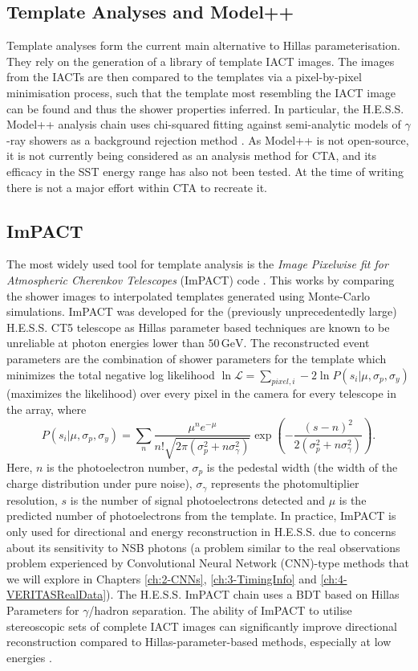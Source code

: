 \subsection{Template Analyses and Model++}
Template analyses \cite{model++} \cite{cat} \cite{3danalysis}  \cite{impact} form the current main alternative to Hillas parameterisation. They rely on the generation of a library of template IACT images. The images from the IACTs are then compared to the templates via a pixel-by-pixel minimisation process, such that the template most resembling the IACT image can be found and thus the shower properties inferred. In particular, the H.E.S.S. Model++ analysis chain uses chi-squared fitting against semi-analytic models of $\gamma$-ray showers as a background rejection method \cite{model++}. As Model++ is not open-source, it is not currently being considered as an analysis method for CTA, and its efficacy in the SST energy range has also not been tested. At the time of writing there is not a major effort within CTA to recreate it.

\subsection{ImPACT}
The most widely used tool for template analysis is the \textit{Image Pixelwise fit for Atmospheric Cherenkov Telescopes} (ImPACT) code \cite{impact}. This works by comparing the shower images to interpolated templates generated using Monte-Carlo simulations. ImPACT was developed for the (previously unprecedentedly large) H.E.S.S. CT5 telescope as Hillas parameter based techniques are known to be unreliable at photon energies lower than $\mathrm{50\,GeV}$. The reconstructed event parameters are the combination of shower parameters for the template which minimizes the total negative log likelihood $\ln\mathcal{L}=\sum_{pixel,i}-2\ln{P(s_i|\mu,\sigma_p,\sigma_y)}$(maximizes the likelihood) over every pixel in the camera for every telescope in the array, where
\begin{equation}
P(s_i|\mu,\sigma_p,\sigma_y)=\sum_n \frac{\mu^n e^{-\mu}}{n!\sqrt{2\pi (\sigma_p^2+n\sigma_{\gamma}^2)}} \exp \left(-\frac{(s-n)^2}{2(\sigma_p^2 + n \sigma_{\gamma}^2)} \right).
\end{equation}
Here, $n$ is the photoelectron number, $\sigma_p$ is the pedestal width (the width of the charge distribution under pure noise), $\sigma_{\gamma}$ represents the photomultiplier resolution, $s$ is the number of signal photoelectrons detected and $\mu$ is the predicted number of photoelectrons from the template. In practice, ImPACT is only used for directional and energy reconstruction in H.E.S.S. due to concerns about its sensitivity to NSB photons (a problem similar to the real observations problem experienced by Convolutional Neural Network (CNN)-type methods that we will explore in Chapters \ref{ch:2-CNNs}, \ref{ch:3-TimingInfo} and \ref{ch:4-VERITASRealData}). The H.E.S.S. ImPACT chain uses a BDT based on Hillas Parameters for $\gamma$/hadron separation. The ability of ImPACT to utilise stereoscopic sets of complete IACT images can significantly improve directional reconstruction compared to Hillas-parameter-based methods, especially at low energies \cite{impact}.

